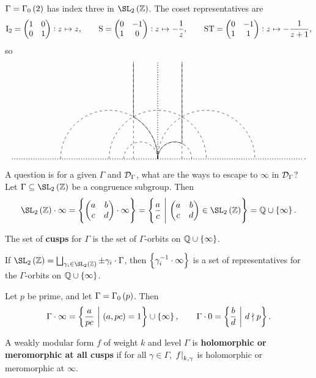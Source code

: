 \begin{example*}
$ \Gamma = \Gamma_0\br{2} $ has index three in $ \SL_2\br{\ZZ} $. The coset representatives are
$$ \mathrm{I}_2 = \begin{pmatrix} 1 & 0 \\ 0 & 1 \end{pmatrix} : z \mapsto z, \qquad \mathrm{S} = \begin{pmatrix} 0 & -1 \\ 1 & 0 \end{pmatrix} : z \mapsto -\dfrac{1}{z}, \qquad \mathrm{S}\mathrm{T} = \begin{pmatrix} 0 & -1 \\ 1 & 1 \end{pmatrix} : z \mapsto -\dfrac{1}{z + 1}, $$
so
$$
\begin{tikzpicture}[scale=2]
\draw [dotted, thick] (-3, 0) to (3, 0);
\draw [dotted, thick] (0, 0) to (0, 2);
\draw [dashed] (-2, 0) arc (180:0:1);
\draw [dashed] (-1, 0) arc (180:0:1);
\draw [dashed] (0, 0) arc (180:0:1);
\draw [dashed] (-0.7, 0) arc (180:0:0.35);
\draw [dashed] (0, 0) arc (180:0:0.35);
\draw [dashed] (-0.5, 0) to (-0.5, 2);
\draw [dashed] (0.5, 0) to (0.5, 2);
\draw (-0.5, 0.866) arc (60:0:1);
\draw (0, 0) arc (180:60:0.35);
\draw (-0.5, 0.866) to (-0.5, 2);
\draw (0.5, 0.35) to (0.5, 2);
\end{tikzpicture}.
$$
\end{example*}

A question is for a given $ \Gamma $ and $ \mathcal{D}_\Gamma $, what are the ways to escape to $ \infty $ in $ \mathcal{D}_\Gamma $? Let $ \Gamma \subseteq \SL_2\br{\ZZ} $ be a congruence subgroup. Then
$$ \SL_2\br{\ZZ} \cdot \infty = \cbr{\twobytwo{a}{b}{c}{d} \cdot \infty} = \cbr{\dfrac{a}{c} \st \twobytwo{a}{b}{c}{d} \in \SL_2\br{\ZZ}} = \QQ \cup \cbr{\infty}. $$

\begin{definition}
The set of \textbf{cusps} for $ \Gamma $ is the set of $ \Gamma $-orbits on $ \QQ \cup \cbr{\infty} $.
\end{definition}

\begin{note*}
If $ \SL_2\br{\ZZ} = \bigsqcup_{\gamma_i \in \SL_2\br{\ZZ}} \pm\gamma_i \cdot \Gamma $, then $ \cbr{\gamma_i^{-1} \cdot \infty} $ is a set of representatives for the $ \Gamma $-orbits on $ \QQ \cup \cbr{\infty} $.
\end{note*}

\begin{example*}
Let $ p $ be prime, and let $ \Gamma = \Gamma_0\br{p} $. Then
$$ \Gamma \cdot \infty = \cbr{\dfrac{a}{pc} \st \br{a, pc} = 1} \cup \cbr{\infty}, \qquad \Gamma \cdot 0 = \cbr{\dfrac{b}{d} \st d \nmid p}. $$
\end{example*}

\begin{definition}
A weakly modular form $ f $ of weight $ k $ and level $ \Gamma $ is \textbf{holomorphic or meromorphic at all cusps} if for all $ \gamma \in \Gamma $, $ \left. f \right|_{k, \gamma} $ is holomorphic or meromorphic at $ \infty $.
\end{definition}

